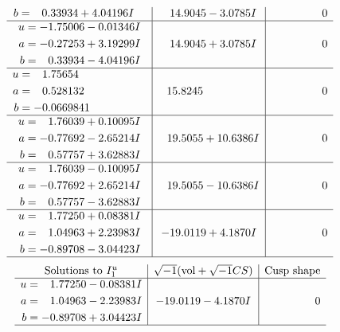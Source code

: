 \documentclass[1p]{elsarticle_modified}
\theoremstyle{definition}
\newcommand{\I}{\sqrt{-1}}
\begin{document}
$$\begin{array}{c|c|c}
\begin{aligned}
b &= \phantom{-}0.33934 + 4.04196 I\end{aligned}
 & \phantom{-}14.9045 - 3.0785 I & \phantom{-0.000000 } 0 \\ \hline\begin{aligned}
u &= -1.75006 - 0.01346 I \\
a &= -0.27253 + 3.19299 I \\
b &= \phantom{-}0.33934 - 4.04196 I\end{aligned}
 & \phantom{-}14.9045 + 3.0785 I & \phantom{-0.000000 } 0 \\ \hline\begin{aligned}
u &= \phantom{-}1.75654\phantom{ +0.000000I} \\
a &= \phantom{-}0.528132\phantom{ +0.000000I} \\
b &= -0.0669841\phantom{ +0.000000I}\end{aligned}
 & \phantom{-}15.8245\phantom{ +0.000000I} & \phantom{-0.000000 } 0 \\ \hline\begin{aligned}
u &= \phantom{-}1.76039 + 0.10095 I \\
a &= -0.77692 - 2.65214 I \\
b &= \phantom{-}0.57757 + 3.62883 I\end{aligned}
 & \phantom{-}19.5055 + 10.6386 I & \phantom{-0.000000 } 0 \\ \hline\begin{aligned}
u &= \phantom{-}1.76039 - 0.10095 I \\
a &= -0.77692 + 2.65214 I \\
b &= \phantom{-}0.57757 - 3.62883 I\end{aligned}
 & \phantom{-}19.5055 - 10.6386 I & \phantom{-0.000000 } 0 \\ \hline\begin{aligned}
u &= \phantom{-}1.77250 + 0.08381 I \\
a &= \phantom{-}1.04963 + 2.23983 I \\
b &= -0.89708 - 3.04423 I\end{aligned}
 & -19.0119 + 4.1870 I & \phantom{-0.000000 } 0\\
 \hline 
 \end{array}$$\newpage$$\begin{array}{c|c|c}  
\text{Solutions to }I^u_{1}& \I (\text{vol} + \sqrt{-1}CS) & \text{Cusp shape}\\
 \hline 
\begin{aligned}
u &= \phantom{-}1.77250 - 0.08381 I \\
a &= \phantom{-}1.04963 - 2.23983 I \\
b &= -0.89708 + 3.04423 I\end{aligned}
 & -19.0119 - 4.1870 I & \phantom{-0.000000 } 0\\
 \hline 
 \end{array}$$\newpage\newpage\renewcommand{\arraystretch}{1}
\end{document}
